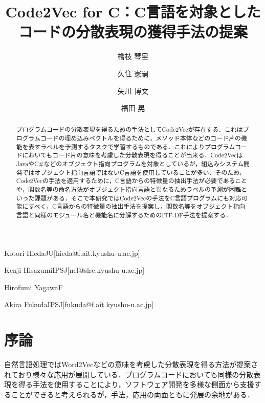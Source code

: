 \documentclass[submit,techrep,noauthor]{ipsj}
\begin{document}
\title{Code2Vec for C：C言語を対象としたコードの分散表現の獲得手法の提案}



\author{檜枝 琴里}{Kotori Hieda}{JU}[hieda@f.ait.kyushu-u.ac.jp]
\author{久住 憲嗣}{Kenji Hisazumi}{IPSJ}[nel@slrc.kyushu-u.ac.jp]
\author{矢川 博文}{Hirofumi Yagawa}{F}
\author{福田 晃}{Akira Fukuda}{IPSJ}[fukuda@f.ait.kyushu-u.ac.jp]

\begin{abstract}
プログラムコードの分散表現を得るための手法としてCode2Vecが存在する．これはプログラムコードの埋め込みベクトルを得るために，メソッド本体などのコード片の機能を表すラベルを予測するタスクで学習するものである．これによりプログラムコードにおいてもコード片の意味を考慮した分散表現を得ることが出来る．Code2VecはJavaやC\#などのオブジェクト指向プログラムを対象としているが，組込みシステム開発ではオブジェクト指向言語ではないC言語を使用していることが多い．そのため，Code2Vecの手法を適用するために，C言語からの特徴量の抽出手法が必要であることや，関数名等の命名方法がオブジェクト指向言語と異なるためラベルの予測が困難といった課題がある．そこで本研究ではCode2Vecの手法をC言語プログラムにも対応可能にすべく，C言語からの特徴量の抽出手法を提案し，関数名等をオブジェクト指向言語と同様のモジュール名と機能名に分解するためのITF-DF手法を提案する．
\end{abstract}



\maketitle

\section{序論}
自然言語処理ではWord2Vec\cite{rong2014word2vec}などの意味を考慮した分散表現を得る方法が提案されており様々な応用が展開している．プログラムコードにおいても同様の分散表現を得る手法を使用することにより，ソフトウェア開発を多様な側面から支援することができると考えられるが，手法，応用の両面ともに発展の余地がある．
\end{document}
